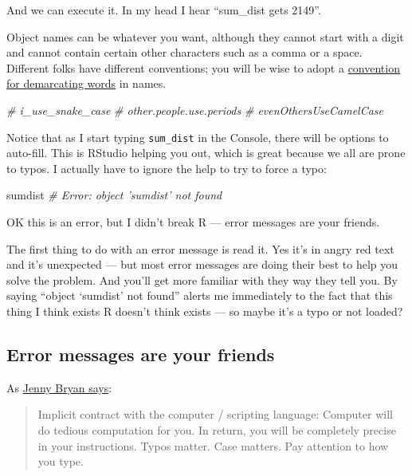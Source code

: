 \documentclass[]{book}
\newenvironment{Shaded}{\begin{snugshade}}{\end{snugshade}}
\newcommand{\CommentTok}[1]{\textcolor[rgb]{0.56,0.35,0.01}{\textit{#1}}}
\newcommand{\NormalTok}[1]{#1}
\begin{document}
And we can execute it. In my head I hear ``sum\_dist gets 2149''.

Object names can be whatever you want, although they cannot start with a digit and cannot contain certain other characters such as a comma or a space. Different folks have different conventions; you will be wise to adopt a \href{http://en.wikipedia.org/wiki/Snake_case}{convention for demarcating words} in names.

\begin{Shaded}
\begin{Highlighting}[]
\CommentTok{# i_use_snake_case}
\CommentTok{# other.people.use.periods}
\CommentTok{# evenOthersUseCamelCase}
\end{Highlighting}
\end{Shaded}

Notice that as I start typing \texttt{sum\_dist} in the Console, there will be options to auto-fill. This is RStudio helping you out, which is great because we all are prone to typos. I actually have to ignore the help to try to force a typo:

\begin{Shaded}
\begin{Highlighting}[]
\NormalTok{sumdist}
\CommentTok{# Error: object 'sumdist' not found}
\end{Highlighting}
\end{Shaded}

OK this is an error, but I didn't break R --- error messages are your friends.

The first thing to do with an error message is read it. Yes it's in angry red text and it's unexpected --- but most error messages are doing their best to help you solve the problem. And you'll get more familiar with they way they tell you. By saying ``object `sumdist' not found'' alerts me immediately to the fact that this thing I think exists R doesn't think exists --- so maybe it's a typo or not loaded?

\hypertarget{error-messages-are-your-friends}{%
\subsection{Error messages are your friends}\label{error-messages-are-your-friends}}

As \href{https://stat545.com/r-basics.html}{Jenny Bryan says}:

\begin{quote}
Implicit contract with the computer / scripting language: Computer will do tedious computation for you. In return, you will be completely precise in your instructions. Typos matter. Case matters. Pay attention to how you type.
\end{quote}
\end{document}
